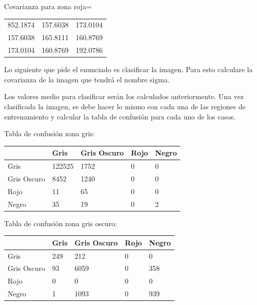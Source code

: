 \documentclass[a4paper,10pt]{article}
\begin{document}
Covarianza para zona roja=
\begin{tabular}{ l c r }
  852.1874&  157.6038  &173.0104\\
  157.6038 & 165.8111 & 160.8769\\
  173.0104  &160.8769&  192.0786\\
\end{tabular}\newline

Lo siguiente que pide el enunciado es clasificar la imagen. Para esto calculare la covarianza de la imagen que tendr\'a el nombre sigma. 

Los valores medio para clasificar ser\'an los calculados anteriormente.
Una vez clasificada la imagen, se debe hacer lo mismo con cada una de las regiones de entrenamiento y calcular la tabla de confusi\'on para cada uno de los casos.\newline


Tabla de confusión zona gris:\newline

\begin{tabular}{ | l | l | l | l | l |  }
		& Gris &   Gris Oscuro     & Rojo    & Negro\\ \hline
  Gris    	&       122525       & 1752  &         0&           0\\ \hline
  Gris Oscuro   &      8452       & 1240    &       0    &       0\\ \hline
  Rojo       	&         11       &   65  &         0    &       0\\ \hline
  Negro       	&         35        &  19 &          0     &      2\\ \hline
 
\end{tabular}\newline


Tabla de confusión zona gris oscuro:\newline

\begin{tabular}{ | l | l | l | l | l |  }
		& Gris &   Gris Oscuro     & Rojo    & Negro\\ \hline
Gris &	  	249 &        212  & 0 &       0\\ \hline
Gris Oscuro &    93   &     6059  &   0 &   358\\ \hline
Rojo		 & 0 & 0& 0 & 0\\ \hline
Negro &           1    &    1093 &   0   &  939\\ \hline
\end{tabular}\newline
\end{document}
